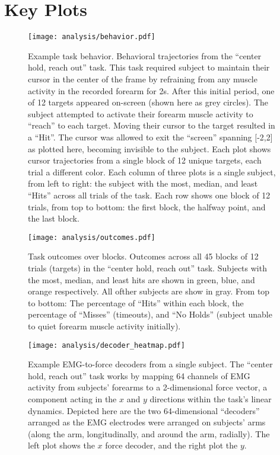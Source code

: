\documentclass[../main.tex]{subfiles}
\begin{document}
\section{Key Plots}\label{key-plots}

\begin{figure}
\centering
\texttt{[image: analysis/behavior.pdf]}
\caption{Example task behavior. Behavioral trajectories from the
``center hold, reach out'' task. This task required subject to maintain
their cursor in the center of the frame by refraining from any muscle
activity in the recorded forearm for 2s. After this initial period, one
of 12 targets appeared on-screen (shown here as grey circles). The
subject attempted to activate their forearm muscle activity to ``reach''
to each target. Moving their cursor to the target resulted in a ``Hit''.
The cursor was allowed to exit the ``screen'' spanning {[}-2,2{]} as
plotted here, becoming invisible to the subject. Each plot shows cursor
trajectories from a single block of 12 unique targets, each trial a
different color. Each column of three plots is a single subject, from
left to right: the subject with the most, median, and least ``Hits''
across all trials of the task. Each row shows one block of 12 trials,
from top to bottom: the first block, the halfway point, and the last
block.}\label{fig:behavior}
\end{figure}

\begin{figure}
\centering
\texttt{[image: analysis/outcomes.pdf]}
\caption{Task outcomes over blocks. Outcomes across all 45 blocks of 12
trials (targets) in the ``center hold, reach out'' task. Subjects with
the most, median, and least hits are shown in green, blue, and orange
respectively. All ofther subjects are show in gray. From top to bottom:
The percentage of ``Hits'' within each block, the percentage of
``Misses'' (timeouts), and ``No Holds'' (subject unable to quiet forearm
muscle activity initially).}\label{fig:outcomes}
\end{figure}

\begin{figure}
\centering
\texttt{[image: analysis/decoder\_heatmap.pdf]}
\caption{Example EMG-to-force decoders from a single subject. The
``center hold, reach out'' task works by mapping 64 channels of EMG
activity from subjects' forearms to a 2-dimensional force vector, a
component acting in the \(x\) and \(y\) directions within the task's
linear dynamics. Depicted here are the two 64-dimensional ``decoders''
arranged as the EMG electrodes were arranged on subjects' arms (along
the arm, longitudinally, and around the arm, radially). The left plot
shows the \(x\) force decoder, and the right plot the
\(y\).}\label{fig:decoders}
\end{figure}
\end{document}
